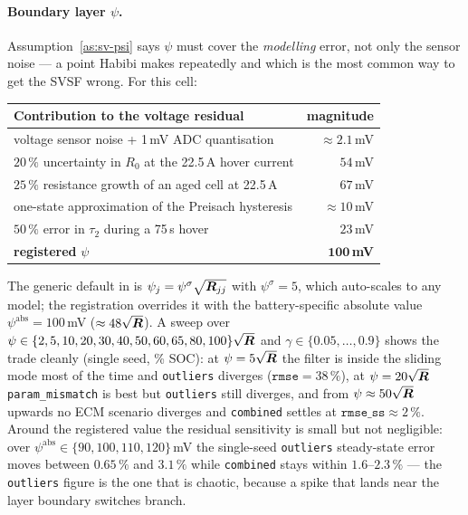 \paragraph{Boundary layer $\psi$.}  Assumption~\ref{as:sv-psi} says $\psi$ must cover the
\emph{modelling} error, not only the sensor noise --- a point Habibi makes repeatedly and which is
the most common way to get the SVSF wrong.  For this cell:
\begin{center}\small
\begin{tabular}{@{}lr@{}}
\toprule
Contribution to the voltage residual & magnitude \\
\midrule
voltage sensor noise + 1\,mV ADC quantisation & $\approx2.1$\,mV\\
$20\,\%$ uncertainty in $R_0$ at the 22.5\,A hover current & $54$\,mV\\
$25\,\%$ resistance growth of an aged cell at 22.5\,A & $67$\,mV\\
one-state approximation of the Preisach hysteresis & $\approx10$\,mV\\
$50\,\%$ error in $\tau_2$ during a 75\,s hover & $23$\,mV\\
\midrule
\textbf{registered} $\psi$ & $\bm{100}$\,\textbf{mV}\\
\bottomrule
\end{tabular}
\end{center}
The generic default in  is $\psi_j=\psi^\sigma\sqrt{\bm{R}_{jj}}$ with
$\psi^\sigma=5$, which auto-scales to any model; the registration overrides it with the
battery-specific absolute value $\psi^{\mathrm{abs}}=100$\,mV
($\approx48\sqrt{\bm{R}}$).  A sweep over $\psi\in\{2,5,10,20,30,40,50,60,65,80,100\}\sqrt{\bm{R}}$ and
$\gamma\in\{0.05,\dots,0.9\}$ shows the trade cleanly (single seed, \% SOC): at
$\psi=5\sqrt{\bm{R}}$ the filter is inside the sliding mode most of the time and \texttt{outliers}
diverges ($\texttt{rmse}=38\,\%$), at $\psi=20\sqrt{\bm{R}}$ \texttt{param\_mismatch} is best but
\texttt{outliers} still diverges, and from $\psi\approx50\sqrt{\bm{R}}$ upwards no ECM scenario
diverges and \texttt{combined} settles at $\texttt{rmse\_ss}\approx2\,\%$.  Around the registered
value the residual sensitivity is small but not negligible: over
$\psi^{\mathrm{abs}}\in\{90,100,110,120\}$\,mV the single-seed \texttt{outliers} steady-state error
moves between $0.65\,\%$ and $3.1\,\%$ while \texttt{combined} stays within
$1.6$--$2.3\,\%$ --- the \texttt{outliers} figure is the one that is chaotic, because a spike that
lands near the layer boundary switches branch.

